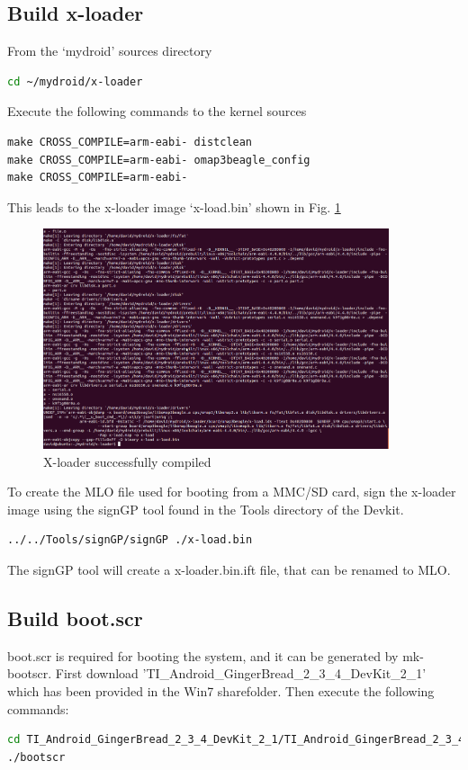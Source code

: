\documentclass[12pt,journal,draftclsnofoot,onecolumn]{IEEEtran}
\begin{document}
\subsection{Build x-loader}
From the `mydroid' sources directory

\begin{lstlisting}[language={bash}]
cd ~/mydroid/x-loader
\end{lstlisting}

Execute the following commands to the kernel sources

\begin{lstlisting}[language={make}]
make CROSS_COMPILE=arm-eabi- distclean
make CROSS_COMPILE=arm-eabi- omap3beagle_config
make CROSS_COMPILE=arm-eabi-
\end{lstlisting}

This leads to the x-loader image `x-load.bin' shown in Fig. \ref{x-loader}

\begin{figure}[ht]
	\centering
	\includegraphics[width=4in]{./figs/x-loader.png}
	\caption{X-loader successfully compiled}
	\label{x-loader}
\end{figure}

To create the MLO file used for booting from a MMC/SD card, sign the x-loader image using the signGP tool found
in the Tools directory of the Devkit. 

\begin{lstlisting}[language={bash}]
../../Tools/signGP/signGP ./x-load.bin
\end{lstlisting}

The signGP tool will create a x-loader.bin.ift file, that can be renamed to MLO.

\subsection{Build boot.scr}
boot.scr is required for booting the system, and it can be generated by mk-bootscr.
First download 'TI\_Android\_GingerBread\_2\_3\_4\_DevKit\_2\_1' which has been provided in the Win7 sharefolder.
Then execute the following commands:
\begin{lstlisting}[language={bash}]
cd TI_Android_GingerBread_2_3_4_DevKit_2_1/TI_Android_GingerBread_2_3_4_DevKit_2_1/Tools/mk-bootscr/
./bootscr
\end{lstlisting}
 
\end{document}
